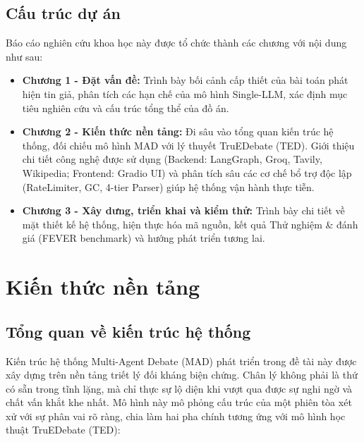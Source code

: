\documentclass[12pt,a4paper]{report}
\begin{document}
\section{Cấu trúc dự án}
Báo cáo nghiên cứu khoa học này được tổ chức thành các chương với nội dung như sau:
\begin{itemize}
    \item \textbf{Chương 1 - Đặt vấn đề:} Trình bày bối cảnh cấp thiết của bài toán phát hiện tin giả, phân tích các hạn chế của mô hình Single-LLM, xác định mục tiêu nghiên cứu và cấu trúc tổng thể của đồ án.
    \item \textbf{Chương 2 - Kiến thức nền tảng:} Đi sâu vào tổng quan kiến trúc hệ thống, đối chiếu mô hình MAD với lý thuyết TruEDebate (TED). Giới thiệu chi tiết công nghệ được sử dụng (Backend: LangGraph, Groq, Tavily, Wikipedia; Frontend: Gradio UI) và phân tích sâu các cơ chế bổ trợ độc lập (RateLimiter, GC, 4-tier Parser) giúp hệ thống vận hành thực tiễn.
    \item \textbf{Chương 3 - Xây dưng, triển khai và kiểm thử:} Trình bày chi tiết về mặt thiết kế hệ thống, hiện thực hóa mã nguồn, kết quả Thử nghiệm \& đánh giá (FEVER benchmark) và hướng phát triển tương lai.
\end{itemize}

\newpage

\chapter{Kiến thức nền tảng}
\setcounter{page}{9}

\section{Tổng quan về kiến trúc hệ thống}
Kiến trúc hệ thống Multi-Agent Debate (MAD) phát triển trong đề tài này được xây dựng trên nền tảng triết lý đối kháng biện chứng. Chân lý không phải là thứ có sẵn trong tĩnh lặng, mà chỉ thực sự lộ diện khi vượt qua được sự nghi ngờ và chất vấn khắt khe nhất. Mô hình này mô phỏng cấu trúc của một phiên tòa xét xử với sự phân vai rõ ràng, chia làm hai pha chính tương ứng với mô hình học thuật TruEDebate (TED):
\end{document}
